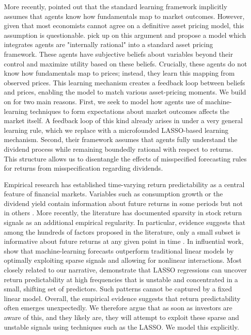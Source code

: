 \documentclass[11pt]{article}
\begin{document}
More recently, \cite{adam2011internal} pointed out that the standard learning framework implicitly assumes that agents know how fundamentals map to market outcomes.
However, given that most economists cannot agree on a definitive asset pricing model, this assumption is questionable.
\cite{Adam2016} pick up on this argument and propose a model which integrates agents are "internally rational" into a standard \cite{Lucas1978} asset pricing framework.
These agents have subjective beliefs about variables beyond their control and maximize utility based on these beliefs. 
Crucially, these agents do not know how fundamentals map to prices; instead, they learn this mapping from observed prices.
This learning mechanism creates a feedback loop between beliefs and prices, enabling the model to match various asset-pricing moments.
We build on \cite{Adam2016} for two main reasons.
First, we seek to model how agents use of machine-learning techniques to form expectations about market outcomes affects the market itself. 
A feedback loop of this kind already arises in \cite{Adam2016} under a very general learning rule, which we replace with a microfounded LASSO-based learning mechanism.
Second, their framework assumes that agents fully understand the dividend process while remaining boundedly rational with respect to returns. 
This structure allows us to disentangle the effects of misspecified forecasting rules for returns from misspecification regarding dividends.

Empirical research has established time-varying return predictability as a central feature of financial markets. 
Variables such as consumption growth or the dividend yield contain information about future returns in some periods but not in others \citep{AngBekaert2007_RFS,GoyalWelch2003_MS,LettauLudvigson2001_JF}. 
More recently, the literature has documented sparsity in stock return signals as an additional empirical regularity. 
In particular, evidence suggests that among the hundreds of factors proposed in the literature, only a small subset is informative about future returns at any given point in time \citep{kozak2020shrinking,freyberger2020dissecting,Feng2020}.
In influential work, \cite{gu2020empirical} show that machine-learning forecasts outperform traditional linear models by optimally exploiting sparse signals and allowing for nonlinear interactions. 
Most closely related to our narrative, \cite{Chinco2019} demonstrate that LASSO regressions can uncover return predictability at high frequencies that is unstable and concentrated in a small, shifting set of predictors. 
Such patterns cannot be captured by a fixed linear model.
Overall, the empirical evidence suggests that return predictability often emerges unexpectedly. 
We therefore argue that as soon as investors are aware of this, and they likely are, they will attempt to exploit these sparse and unstable signals using techniques such as the LASSO.
We model this explicitly.
\end{document}
